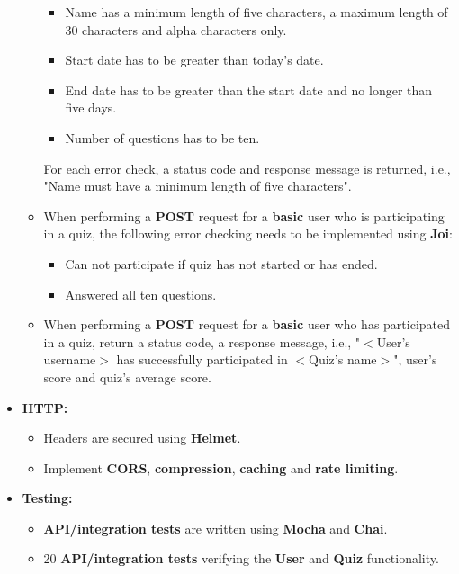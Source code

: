 \documentclass{article}
\begin{document}
\begin{itemize}
\begin{itemize}
		\begin{itemize}
			\item Name has a minimum length of five characters, a maximum length of 30 characters and alpha characters only.
			\item Start date has to be greater than today's date.
			\item End date has to be greater than the start date and no longer than five days. 
			\item Number of questions has to be ten.
		\end{itemize}
		For each error check, a status code and response message is returned, i.e., "Name must have a minimum length of five characters".
		\item When performing a \textbf{POST} request for a \textbf{basic} user who is participating in a quiz, the following error checking needs to be implemented using \textbf{Joi}:
		\begin{itemize}
			\item Can not participate if quiz has not started or has ended.
			\item Answered all ten questions.
		\end{itemize}
		\item When performing a \textbf{POST} request for a \textbf{basic} user who has participated in a quiz, return a status code, a response message, i.e., "$<$User's username$>$ has successfully participated in $<$Quiz's name$>$", user's score and quiz's average score.
	\end{itemize}
	
	\item \textbf{HTTP:}
	\begin{itemize}
		\item Headers are secured using \textbf{Helmet}.
		\item Implement \textbf{CORS}, \textbf{compression}, \textbf{caching} and \textbf{rate limiting}.
	\end{itemize}
	
	\item \textbf{Testing:}
	\begin{itemize}
		\item \textbf{API/integration tests} are written using \textbf{Mocha} and \textbf{Chai}.
		\item 20 \textbf{API/integration tests} verifying the \textbf{User} and \textbf{Quiz} functionality.
	\end{itemize}


\end{itemize}
\end{document}
